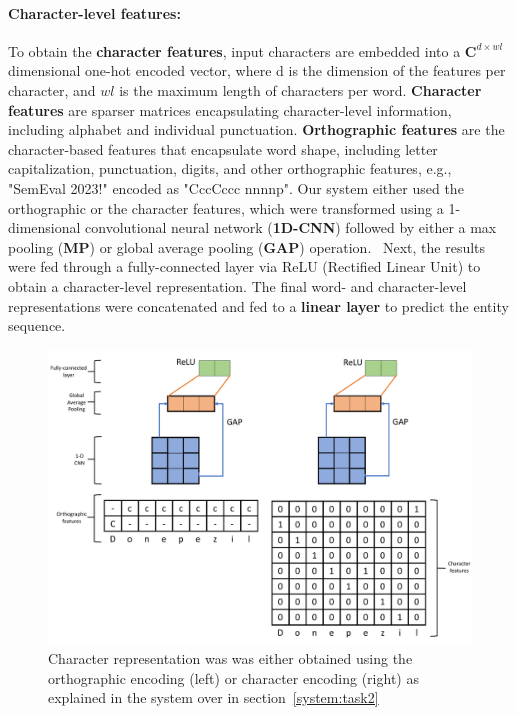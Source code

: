 \documentclass[11pt]{article}
\begin{document}
\paragraph{Character-level features: } 
%
To obtain the \textbf{character features}, input characters are embedded into a $\mathbf{C}^{d \times wl}$ dimensional one-hot encoded vector, where d is the dimension of the features per character, and $wl$ is the maximum length of characters per word.
\textbf{Character features} are sparser matrices encapsulating character-level information, including alphabet and individual punctuation.
\textbf{Orthographic features} are the character-based features that encapsulate word shape, including letter capitalization, punctuation, digits, and other orthographic features, e.g., "SemEval 2023!" encoded as "CccCccc nnnnp". 
Our system either used the orthographic or the character features, which were transformed using a 1-dimensional convolutional neural network (\textbf{1D-CNN}) followed by either a max pooling (\textbf{MP}) or global average pooling (\textbf{GAP}) operation.~\cite{zhou2016learning}
Next, the results were fed through a fully-connected layer via ReLU (Rectified Linear Unit) to obtain a character-level representation.
The final word- and character-level representations were concatenated and fed to a \textbf{linear layer} to predict the entity sequence.
%
%
%
\begin{figure}[!htbp]
    \centering
    \includegraphics[width=\columnwidth]{figures/word_arch2.pdf}
    \caption{Character representation was was either obtained using the orthographic encoding (left) or character encoding (right) as explained in the system over in section~\ref{system:task2}}
    \label{fig:task2_char}
\end{figure}
%
%
%
\end{document}

